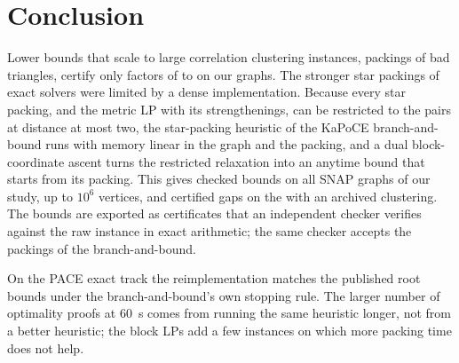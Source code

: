 \section{Conclusion}\label{sec:concl}

Lower bounds that scale to large correlation clustering instances, packings
of bad triangles, certify only factors of \numBaseFacLo{} to \numBaseFacHi{}
on our graphs.  The stronger star packings of exact solvers were limited by a
dense implementation.  Because every star packing, and the metric LP with its
strengthenings, can be restricted to the pairs at distance at most two, the
star-packing heuristic of the KaPoCE branch-and-bound runs with memory linear
in the graph and the packing, and a dual block-coordinate ascent turns the
restricted relaxation into an anytime bound that starts from its packing.
This gives checked bounds on all \numSnapTotal{} SNAP graphs of our study,
up to $10^6$ vertices, and certified gaps on the \numSnapGapN{} with an
archived clustering.  The bounds are exported as certificates that an independent
checker verifies against the raw instance in exact arithmetic; the same
checker accepts the packings of the branch-and-bound.

On the PACE exact track the reimplementation matches the published root
bounds under the branch-and-bound's own stopping rule.  The larger number of
optimality proofs at \SI{60}{s} comes from running the same heuristic longer,
not from a better heuristic; the block LPs add a few instances on which more
packing time does not help.

